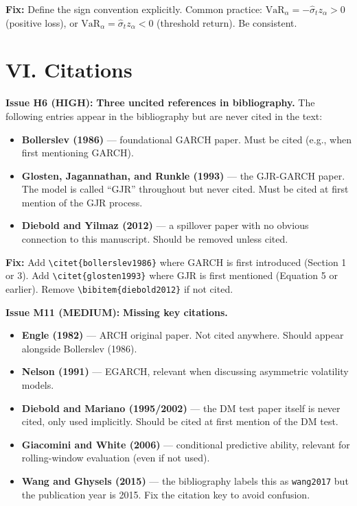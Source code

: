\documentclass[12pt,a4paper]{article}
\begin{document}
\textbf{Fix:} Define the sign convention explicitly. Common practice: $\mathrm{VaR}_\alpha = -\hat{\sigma}_t z_\alpha > 0$ (positive loss), or $\mathrm{VaR}_\alpha = \hat{\sigma}_t z_\alpha < 0$ (threshold return). Be consistent.


\section*{VI. Citations}

\textcolor{errorred}{\textbf{Issue H6 (HIGH):}} \textbf{Three uncited references in bibliography.} The following entries appear in the bibliography but are never cited in the text:
\begin{itemize}
\item \textbf{Bollerslev (1986)} --- foundational GARCH paper. Must be cited (e.g., when first mentioning GARCH).
\item \textbf{Glosten, Jagannathan, and Runkle (1993)} --- the GJR-GARCH paper. The model is called ``GJR'' throughout but never cited. Must be cited at first mention of the GJR process.
\item \textbf{Diebold and Yilmaz (2012)} --- a spillover paper with no obvious connection to this manuscript. Should be removed unless cited.
\end{itemize}

\textbf{Fix:} Add \verb|\citet{bollerslev1986}| where GARCH is first introduced (Section 1 or 3). Add \verb|\citet{glosten1993}| where GJR is first mentioned (Equation 5 or earlier). Remove \verb|\bibitem{diebold2012}| if not cited.

\bigskip

\textcolor{warncolor}{\textbf{Issue M11 (MEDIUM):}} \textbf{Missing key citations.}
\begin{itemize}
\item \textbf{Engle (1982)} --- ARCH original paper. Not cited anywhere. Should appear alongside Bollerslev (1986).
\item \textbf{Nelson (1991)} --- EGARCH, relevant when discussing asymmetric volatility models.
\item \textbf{Diebold and Mariano (1995/2002)} --- the DM test paper itself is never cited, only used implicitly. Should be cited at first mention of the DM test.
\item \textbf{Giacomini and White (2006)} --- conditional predictive ability, relevant for rolling-window evaluation (even if not used).
\item \textbf{Wang and Ghysels (2015)} --- the bibliography labels this as \texttt{wang2017} but the publication year is 2015. Fix the citation key to avoid confusion.
\end{itemize}
\end{document}
